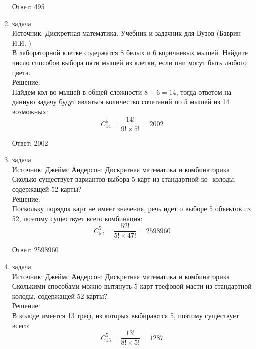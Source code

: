 \documentclass[a4paper,14pt]{extreport} %
\begin{document}
\begin{center}
\begin{enumerate}
						 Ответ: 495
						 
						 \item {\large задача  }\\
						 Источник: Дискретная математика. Учебник и задачник для Вузов (Баврин И.И. )\\
						 \vspace{15pt}
						 В лабораторной клетке содержатся 8 белых и 6 коричневых мышей. Найдите число способов выбора пяти мышей из клетки, если они могут быть любого цвета.\\
						 \vspace{15pt}
						 Решение:\\
						 Найдем кол-во мышей в общей сложности $8+6 = 14$, тогда
						 ответом на данную задачу будут являться количество сочетаний по 5 мышей из 14 возможных:
						 \begin{equation}
						 	C_{14}^5 = \frac{14!}{9!\times5!} = 2002
						 \end{equation}
						 
						 Ответ: 2002
						 
						  \item {\large задача  }\\
						 Источник: Джеймс Андерсон: Дискретная математика и комбинаторика\\
						 \vspace{15pt}
						 Сколько существует вариантов выбора 5 карт из стандартной ко-
						 колоды, содержащей 52 карты?\\
						 \vspace{15pt}
						 Решение:\\
						 Поскольку порядок карт не имеет значения, речь
						 идет о выборе 5 объектов из 52, поэтому существует всего комбинация:
						 \begin{equation}
						 	C_{52}^5 = \frac{52!}{5!\times47!} = 2598960
						 \end{equation}
						 
						 Ответ: 2598960
						 
						 \item {\large задача  }\\
						 Источник: Джеймс Андерсон: Дискретная математика и комбинаторика\\
						 \vspace{15pt}
						 Сколькими способами можно вытянуть 5 карт трефовой масти из
						 стандартной колоды, содержащей 52 карты?\\
						 \vspace{15pt}
						 Решение:\\
						 В колоде имеется 13 треф, из которых выбираются 5, поэтому существует всего:
						 \begin{equation}
						 	C_{13}^5 = \frac{13!}{8!\times5!} = 1287
						 \end{equation}
						 

\end{enumerate}
\end{center}
\end{document}
